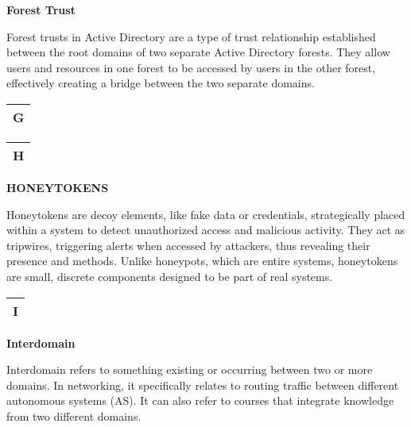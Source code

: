 \textbf{Forest Trust}

Forest trusts in Active Directory are a type of trust relationship established between the root domains of two separate Active Directory forests. They allow users and resources in one forest to be accessed by users in the other forest, effectively creating a bridge between the two separate domains.

\begin{table}
\justifying

\begin{tabular}{l}
\textbf{G} \\
\hline

\end{tabular}

\end{table}

\begin{table}
\justifying

\begin{tabular}{l}
\textbf{H} \\
\hline

\end{tabular}

\end{table}

\textbf{HONEYTOKENS}

Honeytokens are decoy elements, like fake data or credentials, strategically placed within a system to detect unauthorized access and malicious activity. They act as tripwires, triggering alerts when accessed by attackers, thus revealing their presence and methods. Unlike honeypots, which are entire systems, honeytokens are small, discrete components designed to be part of real systems.

\begin{table}
\justifying

\begin{tabular}{l}
\textbf{I} \\
\hline

\end{tabular}

\end{table}

\textbf{Interdomain}

Interdomain refers to something existing or occurring between two or more domains. In networking, it specifically relates to routing traffic between different autonomous systems (AS). It can also refer to courses that integrate knowledge from two different domains.

